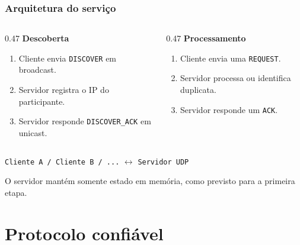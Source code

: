 \documentclass{beamer}
\begin{document}
\begin{frame}
  \frametitle{Arquitetura do serviço}
  \begin{columns}[T]
    \begin{column}{0.47\textwidth}
      \textbf{Descoberta}
      \begin{enumerate}
        \item Cliente envia \texttt{DISCOVER} em broadcast.
        \item Servidor registra o IP do participante.
        \item Servidor responde \texttt{DISCOVER\_ACK} em unicast.
      \end{enumerate}
    \end{column}
    \begin{column}{0.47\textwidth}
      \textbf{Processamento}
      \begin{enumerate}
        \item Cliente envia uma \texttt{REQUEST}.
        \item Servidor processa ou identifica duplicata.
        \item Servidor responde um \texttt{ACK}.
      \end{enumerate}
    \end{column}
  \end{columns}

  \vspace{1.2em}
  \begin{center}
    \texttt{Cliente A / Cliente B / ...} \hspace{1.2em} $\longleftrightarrow$ \hspace{1.2em} \texttt{Servidor UDP}
  \end{center}

  \vspace{0.8em}
  O servidor mantém somente estado em memória, como previsto para a primeira etapa.
\end{frame}

\section{Protocolo confiável}
\end{document}
